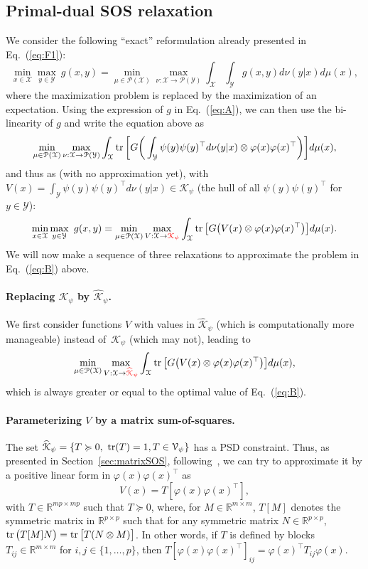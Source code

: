 \documentclass[11pt]{article}
\newcommand{\BEQ}{\begin{equation}}
\newcommand{\EEQ}{\end{equation}}
\newcommand{\tr}{\mathop{ \rm tr}}
\newcommand{\rb}{\mathbb{R}}
\newcommand{\mysec}[1]{Section~\ref{sec:#1}}
\newcommand{\eq}[1]{Eq.~(\ref{eq:#1})}
\def \X{{\mathcal X}}
\def \Y{{\mathcal Y}}
\def \K{{\mathcal K}}
\def \ds{\displaystyle}
\begin{document}
\subsection{Primal-dual SOS relaxation}
We consider the following ``exact'' reformulation already presented in \eq{F1}:
\[
\min_{x \in \X} \max_{y \in \Y} \ g(x,y) 
=
\min_{ \mu \in \mathcal{P}(\X)} \max_{ \nu: \X \to \mathcal{P}(\Y)}
\int_\X \int_\Y g(x,y) d\nu(y|x)  d\mu(x),
\]
where the maximization problem is replaced by the maximization of an expectation.
 Using the expression of $g$ in \eq{A}, we can then use the bi-linearity of $g$ and write the equation above as
  \[
  \min_{ \mu \in \mathcal{P}(\X)} \max_{ \nu: \X \to \mathcal{P}(\Y)}
\int_\X  \tr \bigg[ G \bigg( \int_\Y \psi(y)\psi(y)^\top d\nu(y|x)  \otimes \varphi(x) \varphi(x)^\top \bigg) \bigg]d\mu(x)
,  \]
  and thus
  as (with no approximation yet), with $\ds V(x) =  \int_\Y \psi(y)\psi(y)^\top d\nu(y|x)   \in \K_\psi$ (the hull of all $\psi(y)\psi(y)^\top$ for $y \in \Y$):
  \BEQ
\label{eq:B}  
\min_{x \in \X} \max_{y \in \Y} \ g(x,y) 
= \min_{ \mu \in \mathcal{P}(\X)} \max_{ V: \X \to \textcolor{red}{\K_\psi}}
\int_\X  \tr \big[ G \big(  V(x) \otimes \varphi(x) \varphi(x)^\top  \big) \big] d\mu(x).
  \EEQ
  We will now make a sequence of three relaxations to approximate the problem in \eq{B} above.
  
  \paragraph{Replacing $ {\mathcal{K}_\psi}$ by $\widehat{\mathcal{K}}_\psi$.}
  We first consider functions $V$ with values in $\widehat{\K}_\psi$ (which is computationally more manageable) instead of~${\K}_\psi$ (which may not), leading to
  \BEQ
\label{eq:C}  \min_{ \mu \in \mathcal{P}(\X)} \max_{ V: \X \to  \textcolor{red}{\widehat{\K}_\psi}}
\int_\X  \tr \big[ G \big( V(x)  \otimes \varphi(x) \varphi(x)^\top \big) \big] d\mu(x),
  \EEQ
  which is always greater or equal to the optimal value of \eq{B}.
  
  \paragraph{Parameterizing  $V$ by a matrix sum-of-squares.}
  The set $\widehat{\K}_\psi = \{ T \succcurlyeq 0, \ \tr(T) = 1, T \in \mathcal{V}_\psi\}$ has a PSD constraint. 
   Thus, as presented in \mysec{matrixSOS}, following~\cite{scherer2006matrix,fang2021sum,muzellec2021learning}, we can try to approximate it by a positive linear form in $\varphi(x) \varphi(x)^\top$ as
\[
V(x)  =T [  \varphi(x) \varphi(x)^\top ],
  \]
with $ T \in \rb^{m p \times mp }$ such that $T \succcurlyeq 0$, where, for $M \in \rb^{m\times m}$,  $T [M]$ denotes the symmetric matrix in $\rb^{ p \times p}$ such that for any symmetric matrix $N \in \rb^{p \times p}$, $\tr \big( 
T [M] N \big) = \tr \big[ T ( N \otimes M) \big]$. In other words, if $T$ is defined by blocks $T_{ij} \in \rb^{m \times m}$ for $i,j \in \{1,\dots,p\}$, then $T [  \varphi(x) \varphi(x)^\top ]_{ij} = \varphi(x)^\top T_{ij} \varphi(x)$.
\end{document}
